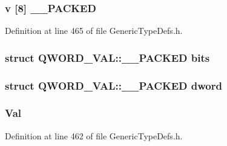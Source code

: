 \subsubsection[{\+\_\+\+\_\+\+P\+A\+C\+K\+E\+D}]{ {\bf v} \mbox{[}8\mbox{]} {\bf \+\_\+\+\_\+\+P\+A\+C\+K\+E\+D}}\label{union_q_w_o_r_d___v_a_l_a884b392c82d52eb89059b87a5d288ccf}


Definition at line 465 of file Generic\+Type\+Defs.\+h.

\hypertarget{union_q_w_o_r_d___v_a_l_ad6a4adc2b43c350aea9051781fcc7a30}{}
\subsubsection[{bits}]{\setlength{\rightskip}{0pt plus 5cm}struct {\bf Q\+W\+O\+R\+D\+\_\+\+V\+A\+L\+::\+\_\+\+\_\+\+P\+A\+C\+K\+E\+D}  bits}\label{union_q_w_o_r_d___v_a_l_ad6a4adc2b43c350aea9051781fcc7a30}
\hypertarget{union_q_w_o_r_d___v_a_l_ab7b7833e9baba96f01a92061705f9684}{}
\subsubsection[{dword}]{\setlength{\rightskip}{0pt plus 5cm}struct {\bf Q\+W\+O\+R\+D\+\_\+\+V\+A\+L\+::\+\_\+\+\_\+\+P\+A\+C\+K\+E\+D}  dword}\label{union_q_w_o_r_d___v_a_l_ab7b7833e9baba96f01a92061705f9684}
\hypertarget{union_q_w_o_r_d___v_a_l_a2b8d25b6ac4b4698966996294ece4580}{}
\subsubsection[{Val}]{ Val}\label{union_q_w_o_r_d___v_a_l_a2b8d25b6ac4b4698966996294ece4580}


Definition at line 462 of file Generic\+Type\+Defs.\+h.

\hypertarget{union_q_w_o_r_d___v_a_l_a39f0ae6958f94a2d2e6b49293c9e6f1c}{}

